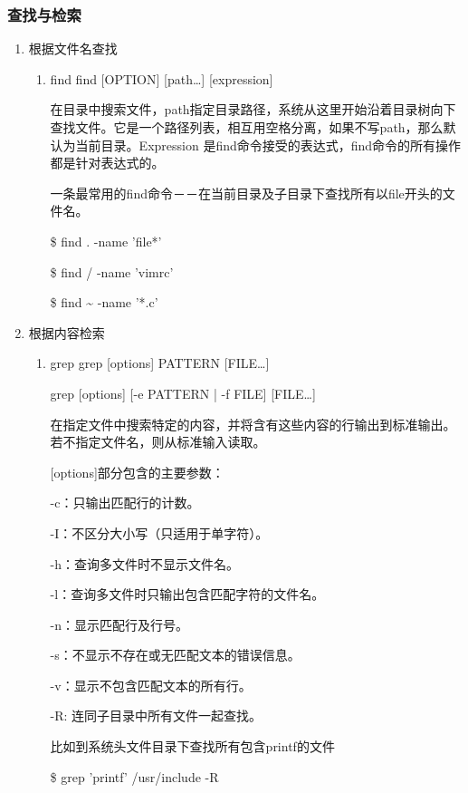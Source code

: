 \documentclass[11pt]{article}
\begin{document}
\subsubsection{查找与检索}
\label{sec-1-1-4}
\begin{enumerate}
\item 根据文件名查找
\label{sec-1-1-4-1}
\begin{enumerate}
\item find
\label{sec-1-1-4-1-1}
find [OPTION] [path\ldots{}] [expression]

在目录中搜索文件，path指定目录路径，系统从这里开始沿着目录树向下查找文件。它是一个路径列表，相互用空格分离，如果不写path，那么默认为当前目录。Expression 是find命令接受的表达式，find命令的所有操作都是针对表达式的。 

一条最常用的find命令－－在当前目录及子目录下查找所有以file开头的文件名。 

\$ find . -name 'file*'

\$ find / -name 'vimrc'

\$ find \textasciitilde{} -name '*.c'
\end{enumerate}

\item 根据内容检索
\label{sec-1-1-4-2}
\begin{enumerate}
\item grep
\label{sec-1-1-4-2-1}
grep [options] PATTERN [FILE\ldots{}]

grep [options] [-e PATTERN | -f FILE] [FILE\ldots{}]

在指定文件中搜索特定的内容，并将含有这些内容的行输出到标准输出。若不指定文件名，则从标准输入读取。 

[options]部分包含的主要参数： 

-c：只输出匹配行的计数。 

-I：不区分大小写（只适用于单字符）。 

-h：查询多文件时不显示文件名。 

-l：查询多文件时只输出包含匹配字符的文件名。 

-n：显示匹配行及行号。 

-s：不显示不存在或无匹配文本的错误信息。 

-v：显示不包含匹配文本的所有行。 

-R: 连同子目录中所有文件一起查找。 

比如到系统头文件目录下查找所有包含printf的文件 

\$ grep 'printf' /usr/include -R
\end{enumerate}
\end{enumerate}
\end{document}
